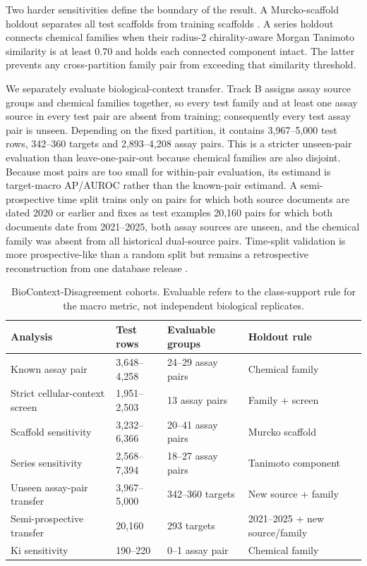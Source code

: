 \documentclass[letterpaper]{article}
\begin{document}
Two harder sensitivities define the boundary of the result. A Murcko-scaffold holdout separates all test scaffolds from training scaffolds \citep{murcko1996}. A series holdout connects chemical families when their radius-2 chirality-aware Morgan Tanimoto similarity is at least 0.70 and holds each connected component intact. The latter prevents any cross-partition family pair from exceeding that similarity threshold.

We separately evaluate biological-context transfer. Track B assigns assay source groups and chemical families together, so every test family and at least one assay source in every test pair are absent from training; consequently every test assay pair is unseen. Depending on the fixed partition, it contains 3,967--5,000 test rows, 342--360 targets and 2,893--4,208 assay pairs. This is a stricter unseen-pair evaluation than leave-one-pair-out because chemical families are also disjoint. Because most pairs are too small for within-pair evaluation, its estimand is target-macro AP/AUROC rather than the known-pair estimand. A semi-prospective time split trains only on pairs for which both source documents are dated 2020 or earlier and fixes as test examples 20,160 pairs for which both documents date from 2021--2025, both assay sources are unseen, and the chemical family was absent from all historical dual-source pairs. Time-split validation is more prospective-like than a random split but remains a retrospective reconstruction from one database release \citep{sheridan2013timesplit}.

\begin{table}[t]
\centering
\caption{BioContext-Disagreement cohorts. Evaluable refers to the class-support rule for the macro metric, not independent biological replicates.}
\label{tab:cohorts}
\small
\begin{tabular}{@{}p{1.7in}p{0.8in}p{1.05in}p{1.8in}@{}}
\toprule
Analysis & Test rows & Evaluable groups & Holdout rule \\
\midrule
Known assay pair & 3,648--4,258 & 24--29 assay pairs & Chemical family \\
Strict cellular-context screen & 1,951--2,503 & 13 assay pairs & Family + screen \\
Scaffold sensitivity & 3,232--6,366 & 20--41 assay pairs & Murcko scaffold \\
Series sensitivity & 2,568--7,394 & 18--27 assay pairs & Tanimoto component \\
Unseen assay-pair transfer & 3,967--5,000 & 342--360 targets & New source + family \\
Semi-prospective transfer & 20,160 & 293 targets & 2021--2025 + new source/family \\
Ki sensitivity & 190--220 & 0--1 assay pair & Chemical family \\
\bottomrule
\end{tabular}
\end{table}
\end{document}
